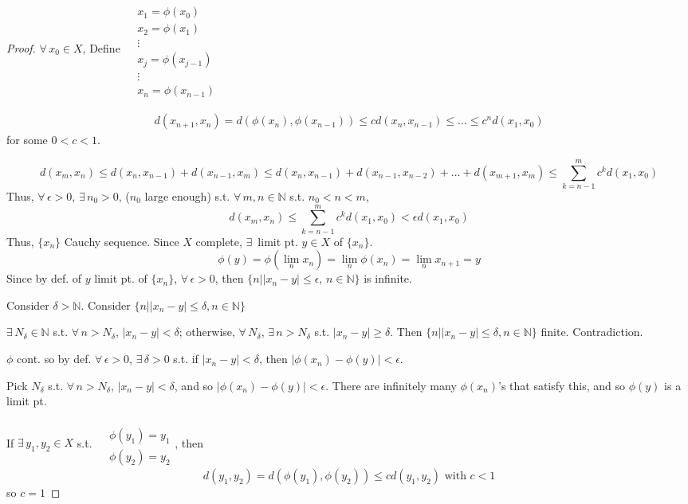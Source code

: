 \documentclass[10pt]{amsart}
\begin{document}
\begin{multicols*}{2}
\begin{proof}
$\forall \, x_0 \in X$,
Define $\begin{aligned} & \quad \\
  & x_1 = \phi(x_0) \\ 
  & x_2 = \phi(x_1) \\ 
  & \vdots \\
  & x_j = \phi(x_{j-1}) \\ 
  & \vdots \\
  & x_n = \phi(x_{n-1})
\end{aligned}$

\[
\begin{gathered}
  d(x_{n+1},x_n) = d(\phi(x_n),\phi(x_{n-1})) \leq c d(x_n,x_{n-1}) \leq \dots \leq c^nd(x_1,x_0)
\end{gathered}
\]
for some $0< c<1$.

\[
d(x_m,x_n) \leq d(x_n,x_{n-1}) + d(x_{n-1},x_m) \leq d(x_n,x_{n-1}) + d(x_{n-1},x_{n-2}) + \dots + d(x_{m+1},x_m) \leq \sum_{k=n-1}^m c^k d(x_1,x_0)
\]
Thus, $\forall \, \epsilon >0$, $\exists \, n_0 >0$, ($n_0$ large enough) s.t. $\forall \, m ,n\in \mathbb{N}$ s.t. $n_0 < n <m$, 
\[
d(x_m,x_n) \leq \sum_{k=n-1}^m c^k d(x_1,x_0) < \epsilon d(x_1,x_0)
\]
Thus, $\lbrace x_n \rbrace$ Cauchy sequence.  Since $X$ complete, $\exists \, $ limit pt. $y \in X$ of $\lbrace x_n \rbrace$.  
\[
\phi(y) = \phi(\lim_n x_n) = \lim_n \phi(x_n) = \lim_n x_{n+1} = y
\]
Since by def. of $y$ limit pt. of $\lbrace x_n \rbrace$, $\forall \, \epsilon >0$, then $\lbrace n | |x_n -y|\leq \epsilon, \, n \in \mathbb{N}\rbrace$ is infinite.  

Consider $\delta > \mathbb{N}$.  Consider $\lbrace n | |x_n-y| \leq \delta, n \in \mathbb{N}\rbrace$ 

$\exists \, N_{\delta} \in \mathbb{N}$ s.t. $\forall \, n > N_{\delta}$, $|x_n-y|< \delta$; otherwise, $\forall \, N_{\delta}$, $\exists \, n > N_{\delta}$ s.t. $|x_n - y| \geq \delta$.  Then $\lbrace n | |x_n -y| \leq \delta , n \in \mathbb{N} \rbrace$ finite.  Contradiction.  

$\phi$ cont. so by def. $\forall \, \epsilon >0$, $\exists \, \delta >0$ s.t. if $|x_n -y| < \delta$, then $|\phi(x_n) - \phi(y) | < \epsilon$.  

Pick $N_{\delta}$ s.t. $\forall \, n > N_{\delta}$, $|x_n-y| < \delta$, and so $|\phi(x_n) - \phi(y)|< \epsilon$. There are infinitely many $\phi(x_n)$'s that satisfy this, and so $\phi(y)$ is a limit pt.  

If $\exists \, y_1,y_2 \in X$ s.t. $\begin{aligned} & \quad \\
  & \phi(y_1) = y_1 \\ 
  & \phi(y_2) = y_2 \end{aligned}$, then
\[
d(y_1,y_2) = d(\phi(y_1), \phi(y_2)) \leq c d(y_1,y_2) \text{ with } c <1
\]
so $c=1$
\end{proof}



\end{multicols*}
\end{document}
